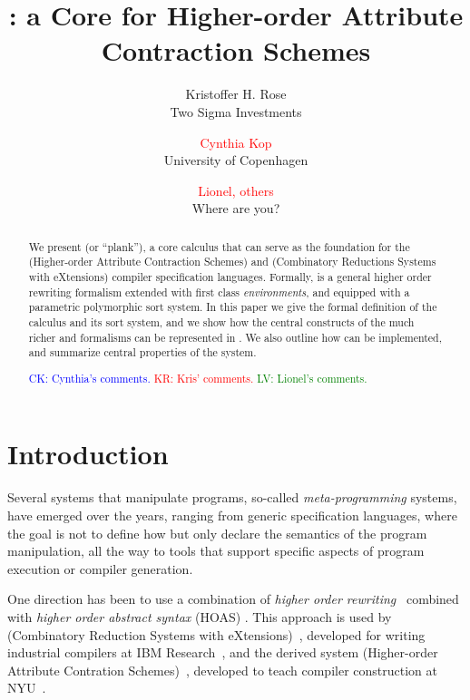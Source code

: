 \documentclass[letterpaper,11pt]{article}
\title{ \hax: a Core for Higher-order Attribute Contraction Schemes }
\author{ Kristoffer H. Rose \\
 Two Sigma Investments
 \and
 \textcolor{red}{Cynthia Kop} \\
 University of Copenhagen
 \and
 \textcolor{red}{Lionel, others} \\
 Where are you?
}
\newcommand{\CK}[1]{\textcolor{blue}{CK: #1}}
\newcommand{\KR}[1]{\textcolor{red}{KR: #1}}
\newcommand{\LV}[1]{\textcolor{green}{LV: #1}}
\begin{document}
\maketitle

\begin{abstract}\noindent
  We present \hax (or ``plank''), a core calculus that can serve as the foundation for the \HAX
  (Higher-order Attribute Contraction Schemes) and \CRSX (Combinatory Reductions Systems with
  eXtensions) compiler specification languages.
  Formally, \hax is a general higher order rewriting formalism extended with first class
  \emph{environments}, and equipped with a parametric polymorphic sort system.
  In this paper we give the formal definition of the \hax calculus and its sort system, and we show
  how the central constructs of the much richer \HAX and \CRSX formalisms can be represented in
  \hax. We also outline how \hax can be implemented, and summarize central properties of the system.

  \CK{Cynthia's comments.} \KR{Kris' comments.} \LV{Lionel's comments.}
\end{abstract}

\compacttableofcontents


\section{Introduction}\label{sec:intro}

Several systems that manipulate programs, so-called \emph{meta-programming} systems, have emerged
over the years, ranging from generic specification languages, where the goal is not to define how
but only declare the semantics of the program manipulation, all the way to tools that support
specific aspects of program execution or compiler generation.

One direction has been to use a combination of \emph{higher order
  rewriting}~\cite{Jouannaud:klop2005} combined with \emph{higher order abstract syntax} (HOAS)
\cite{PfenningElliot:pldi1988}. This approach is used by \CRSX (Combinatory Reduction Systems with
eXtensions)~\cite{Rose:1996}, developed for writing industrial compilers at IBM
Research~\cite{Rose:hor2010,Rose:rta2011,dp60:ibm2013}, and the derived system \HAX (Higher-order
Attribute Contration Schemes)~\cite{Rose:ts2015}, developed to teach compiler construction at
NYU~\cite{RoseRose:cims2015}.
\end{document}
